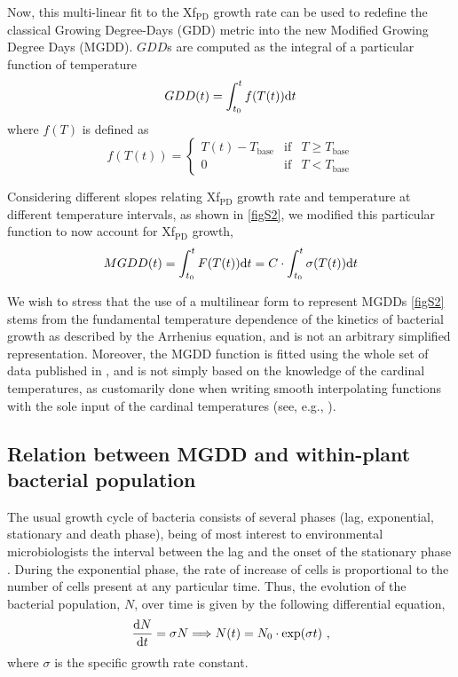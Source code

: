 Now, this multi-linear fit to the Xf$_{\textrm{PD}}$ growth rate can be
used to redefine the classical Growing Degree-Days (GDD) metric into the new
Modified Growing Degree Days (MGDD). $GDD$s are computed as the integral of a
particular function of temperature
\begin{equation}
    GDD(t)=\int_{t_0}^tf(T(t))\mathrm{d} t
\end{equation}
where $f(T)$ is defined as
\begin{equation}
    f(T(t))=\left\{\begin{array}{ccc}
        T(t) - T_{\textrm{base}} & \textrm{if} & T\geq T_{\textrm{base}} \\
        0                        & \textrm{if} & T < T_{\textrm{base}}
    \end{array} \right.
\end{equation}

Considering different slopes relating Xf$_{\textrm{PD}}$ growth rate and
temperature at different temperature intervals, as shown in \cref{figS2}, we
modified this particular function to now account for Xf$_{\textrm{PD}}$ growth,
\begin{equation}\label{eq:MGDD_t}
    MGDD(t)=\int_{t_0}^tF(T(t))\mathrm{d} t=C\cdot\int_{t_0}^t\sigma(T(t))\mathrm{d} t
\end{equation}

We wish to stress that the use of a multilinear form to represent MGDDs
\cref{figS2} stems from the fundamental temperature dependence of the kinetics
of bacterial growth as described by the Arrhenius equation, and is not an
arbitrary simplified representation. Moreover, the MGDD function is fitted
using the whole set of data published in \cite{Feil2001}, and is not simply
based on the knowledge of the cardinal temperatures, as customarily done when
writing smooth interpolating functions with the sole input of the cardinal
temperatures (see, e.g., \cite{Yan1999}).

\subsection{Relation between MGDD and within-plant bacterial
    population}\label{app:MGDD_growth} %

The usual growth cycle of bacteria consists of several phases (lag,
exponential, stationary and death phase), being of most interest to
environmental microbiologists the interval between the lag and the onset of the
stationary phase  \cite{MAIER200937}. During the exponential phase, the rate of
increase of cells is proportional to the number of cells present at any
particular time. Thus, the evolution of the bacterial population, $N$, over
time is given by the following differential equation,
\begin{equation}
    \frac{\mathrm{d} N}{\mathrm{d} t}=\sigma N \Longrightarrow N(t)=N_0\cdot\exp(\sigma t) \ ,
\end{equation}
where $\sigma$ is the specific growth rate constant.

